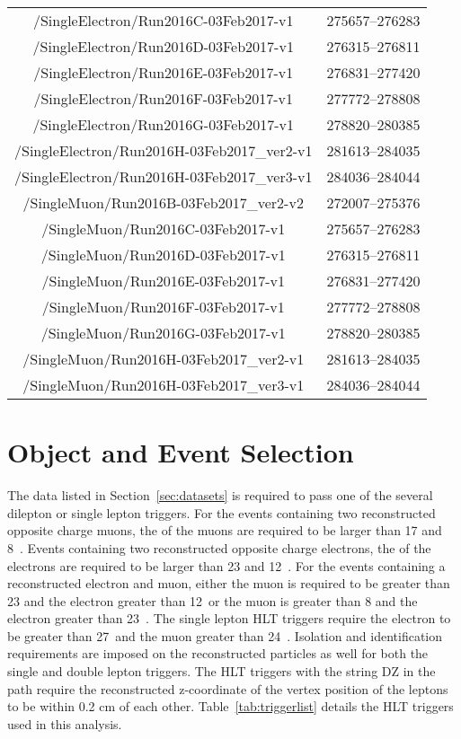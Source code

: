 \begin{table}
\begin{center}
\begin{tabular}{| c |c|}
/SingleElectron/Run2016C-03Feb2017-v1 & 275657--276283\\
/SingleElectron/Run2016D-03Feb2017-v1 & 276315--276811\\
/SingleElectron/Run2016E-03Feb2017-v1 & 276831--277420\\
/SingleElectron/Run2016F-03Feb2017-v1 & 277772--278808\\
/SingleElectron/Run2016G-03Feb2017-v1 & 278820--280385\\
/SingleElectron/Run2016H-03Feb2017\_ver2-v1 & 281613--284035\\
/SingleElectron/Run2016H-03Feb2017\_ver3-v1 & 284036--284044\\\hline
/SingleMuon/Run2016B-03Feb2017\_ver2-v2 & 272007--275376\\
/SingleMuon/Run2016C-03Feb2017-v1 & 275657--276283\\
/SingleMuon/Run2016D-03Feb2017-v1 & 276315--276811\\
/SingleMuon/Run2016E-03Feb2017-v1 & 276831--277420\\
/SingleMuon/Run2016F-03Feb2017-v1 & 277772--278808\\
/SingleMuon/Run2016G-03Feb2017-v1 & 278820--280385\\
/SingleMuon/Run2016H-03Feb2017\_ver2-v1 & 281613--284035\\
/SingleMuon/Run2016H-03Feb2017\_ver3-v1 & 284036--284044\\\hline
\end{tabular}
\end{center}
\end{table}




\section{Object and Event Selection}
The data listed in Section~\ref{sec:datasets} is required to pass one of the several dilepton or single lepton triggers. For the events containing two reconstructed opposite charge muons, the \pT of the muons are required to be larger than 17 and 8~\GeV. Events containing two reconstructed opposite charge electrons, the \pT of the electrons are required to be larger than 23 and 12~\GeV. For the events containing a reconstructed electron and muon, either the muon \pT is required to be greater than 23 \GeV and the electron greater than 12~\GeV or the muon is greater than 8 \GeV and the electron greater than 23~\GeV. The single lepton HLT triggers require the electron \pT to be greater than 27~\GeV and the muon greater than 24~\GeV. Isolation and identification requirements are imposed on the reconstructed particles as well for both the single and double lepton triggers. The HLT triggers with the string DZ in the path require the reconstructed z-coordinate of the vertex position of the leptons to be within 0.2 cm of each other. Table~\ref{tab:triggerlist} details the HLT triggers used in this analysis.

